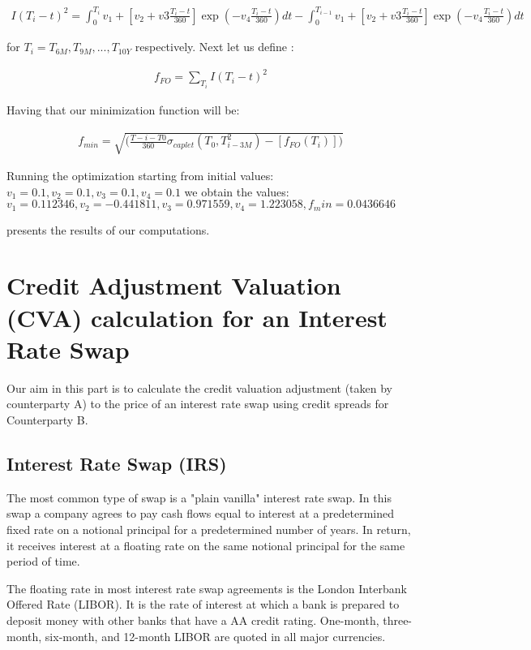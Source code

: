 \documentclass[11pt]{article}
\numberwithin{equation}{subsection}
\begin{document}
\begin{eqnarray*}
	I(T_i - t)^2 = \int_{0}^{T_i} v_1 + [v_2 + v3 \frac{T_i-t}{360}] \exp(-v_4 \frac{T_i-t}{360}) dt
	- \int_{0}^{T_{i-1}} v_1 + [v_2 + v3 \frac{T_i-t}{360}] \exp(-v_4 \frac{T_i-t}{360}) dt
\end{eqnarray*}

for \(T_i = T_{6M}, T_{9M},..., T_{10Y}\) respectively.
Next let us define :

\begin{eqnarray*}
	f_{FO} = \sum_{T_i} I(T_i - t)^2
\end{eqnarray*}

Having that our minimization function will be:

\begin{eqnarray*}
	f_{min} = \sqrt{\big(\frac{T-i-T0}{360} \sigma_{caplet}(T_0, T_{i-3M}^2) - [f_{FO}(T_i)]\big)}
\end{eqnarray*}


Running the optimization starting from initial values: \(v_1=0.1, v_2=0.1, v_3=0.1, v_4=0.1\)  we obtain the values:
\(v_1=0.112346, v_2=-0.441811, v_3=0.971559, v_4=1.223058, f_min=0.0436646\) 

presents the results of our computations.

\newpage
\section{Credit Adjustment Valuation (CVA) calculation for an Interest Rate Swap}
Our aim in this part is to calculate the credit valuation adjustment (taken by counterparty A) to the price of an interest rate swap using credit spreads for Counterparty B.\\

\subsection{Interest Rate Swap (IRS)}
The most common type of swap is a "plain vanilla" interest rate swap. In this swap a
company agrees to pay cash flows equal to interest at a predetermined fixed rate on a
notional principal for a predetermined number of years. In return, it receives interest at
a floating rate on the same notional principal for the same period of time.

The floating rate in most interest rate swap agreements is the London Interbank Offered
Rate (LIBOR). It is the rate of interest at which a bank is prepared to deposit money with other banks that have a AA credit rating. One-month, three-month, six-month, and 12-month LIBOR are quoted in all major currencies.
\end{document}
